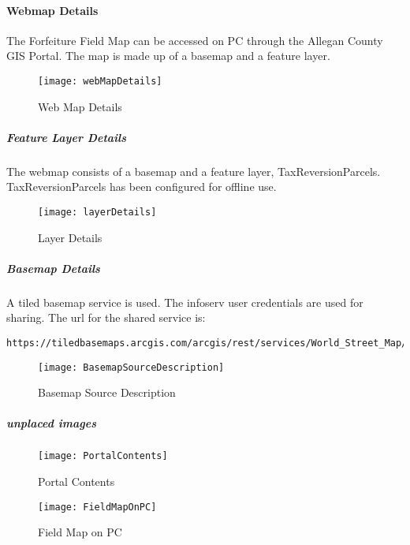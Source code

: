 \documentclass[class=article , crop=false, titlepage, twoside, multi={itemize, figure, verbatim}, float=false]{standalone}
\begin{document}
\clearpage
\paragraph{Webmap Details}The Forfeiture Field Map can be accessed on PC through the Allegan County GIS Portal.  The map is made up of a basemap and a feature layer.
\begin{figure}[h!]
\centering
\texttt{[image: webMapDetails]}
\caption{Web Map Details}
\end{figure}

\subparagraph{Feature Layer Details}The webmap consists of a basemap and a feature layer, TaxReversionParcels.  TaxReversionParcels has been configured for offline use.
\begin{figure}[h!]
\centering
\texttt{[image: layerDetails]}
\caption{Layer Details}
\end{figure}
\clearpage







\subparagraph{Basemap Details}A tiled basemap service is used.  The infoserv user credentials are used for sharing.  The url for the shared service is:
\begin{verbatim}
https://tiledbasemaps.arcgis.com/arcgis/rest/services/World_Street_Map/MapServer
\end{verbatim}
\begin{figure}[h!]
\centering
\texttt{[image: BasemapSourceDescription]}
\caption{Basemap Source Description}
\end{figure}
\clearpage


\subparagraph{unplaced images}
\begin{figure}[h!]
\centering
\texttt{[image: PortalContents]}
\caption{Portal Contents}
\end{figure}

\begin{figure}[h!]
\centering
\texttt{[image: FieldMapOnPC]}
\caption{Field Map on PC}
\end{figure}
\end{document}

